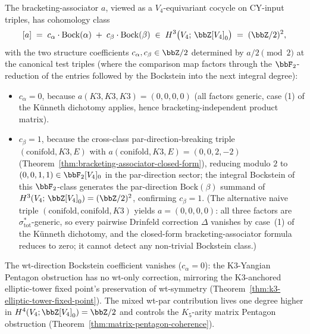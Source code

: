 \begin{theorem}
\label{thm:bracketing-associator-cohomology-class}
The bracketing-associator $a$, viewed as a $V_4$-equivariant cocycle on
CY-input triples, has cohomology class
\[
 [a] \;=\; c_{\alpha} \cdot \mathrm{Bock}(\alpha) \;+\; c_{\beta} \cdot \mathrm{Bock}(\beta)
 \;\in\; H^3\bigl(V_4;\, \bbZ[V_4]_0\bigr) \;=\; (\bbZ/2)^2,
\]
with the two structure coefficients $c_{\alpha}, c_{\beta} \in \bbZ/2$
determined by $a/2 \pmod 2$ at the canonical test triples \textup{(}where
the comparison map factors through the $\bbF_2$-reduction of the entries followed
by the Bockstein into the next integral degree\textup{):}
\begin{itemize}
 \item $c_{\alpha} = 0$, because $a(K3, K3, K3) = (0, 0, 0, 0)$
 \textup{(}all factors generic, case (1) of the K\"unneth dichotomy
 applies, hence bracketing-independent product matrix\textup{).}
 \item $c_{\beta} = 1$, because the cross-class par-direction-breaking
 triple $(\mathrm{conifold}, K3, E)$ with
 $a(\mathrm{conifold}, K3, E) = (0, 0, 2, -2)$
 \textup{(}Theorem~\ref{thm:bracketing-associator-closed-form}\textup{),}
 reducing modulo $2$ to $(0, 0, 1, 1) \in \bbF_2[V_4]_0$ in the
 par-direction sector; the integral Bockstein of this
 $\bbF_2$-class generates the par-direction $\mathrm{Bock}(\beta)$
 summand of $H^3(V_4;\, \bbZ[V_4]_0) = (\bbZ/2)^2$, confirming
 $c_{\beta} = 1$. \textup{(}The alternative naive triple
 $(\mathrm{conifold}, \mathrm{conifold}, K3)$ yields $a = (0, 0, 0, 0)$:
 all three factors are $\sigma_{\mathrm{tot}}^*$-generic, so every
pairwise Drinfeld correction $\Delta$ vanishes by case~(1) of the
K\"unneth dichotomy, and the closed-form bracketing-associator
formula reduces to zero; it cannot detect any non-trivial
Bockstein class.\textup{)}
\end{itemize}
The wt-direction Bockstein coefficient vanishes \textup{(}$c_{\alpha} = 0$\textup{)}:
the K$3$-Yangian Pentagon obstruction has no wt-only correction, mirroring
the K$3$-anchored elliptic-tower fixed point's preservation of wt-symmetry
\textup{(}Theorem~\ref{thm:k3-elliptic-tower-fixed-point}\textup{).} The
mixed wt-par contribution lives one degree higher in
$H^4(V_4; \bbZ[V_4]_0) = \bbZ/2$ and controls the $K_5$-arity matrix
Pentagon obstruction \textup{(}Theorem~\ref{thm:matrix-pentagon-coherence}\textup{).}
\end{theorem}

